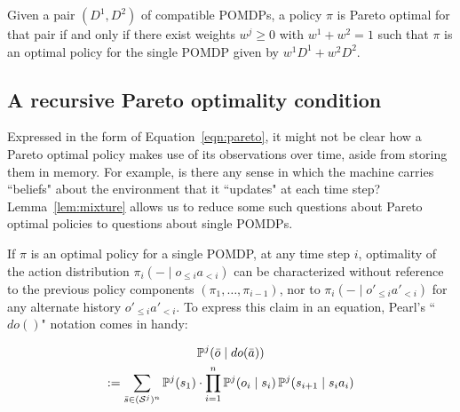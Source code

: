 \documentclass{article}
\newcommand{\seq}{\bar}
\newcommand{\hist}[1]{o_{\le #1}a_{<#1}}
\newcommand{\althist}[1]{o'_{\le #1}a'_{<#1}}
\newcommand{\eqn}[1]{Equation~\ref{eqn:#1}}
\newcommand{\lem}[1]{Lemma~\ref{lem:#1}}
\begin{document}
\begin{lemma}\label{lem:mixture}
Given a pair $(D^1,D^2)$ of compatible POMDPs, a policy $\pi$ is Pareto optimal for that pair if and only if there exist weights $w^j\geq 0$ with $w^1+w^2=1$ such that $\pi$ is an optimal policy for the single POMDP given by $w^1D^1+w^2D^2$.  
\end{lemma}

\subsection{A recursive Pareto optimality condition}

Expressed in the form of \eqn{pareto}, it might not be clear how a Pareto optimal policy makes use of its observations over time, aside from storing them in memory.  For example, is there any sense in which the machine carries ``beliefs" about the environment that it ``updates" at each time step?  \lem{mixture} allows us to reduce some such questions about Pareto optimal policies to questions about single POMDPs.  

If $\pi$ is an optimal policy for a single POMDP, at any time step $i$, optimality of the action distribution $\pi_i(-\mid\hist{i})$ can be characterized without reference to the previous policy components 
$(\pi_1,\ldots,\pi_{i-1})$, nor to $\pi_i(-\mid\althist{i})$ for any alternate history $\althist{i}$.  To express this claim in an equation, Pearl's ``$do()$" notation \citep{pearl2009causality} comes in handy:
\begin{definition}[``do'' notation]
\begin{multline*}
\PP^j(\seq o \mid do(\seq a)) \\ := \sum_{\seq s \in (\Ss^j)^n} \PP^j(s_1) \cdot \prod_{i=1}^n
\PP^j(o_i \mid s_i)\, \PP^j(s_{i+1} \mid s_ia_i)
\end{multline*}
\end{definition}
\end{document}
